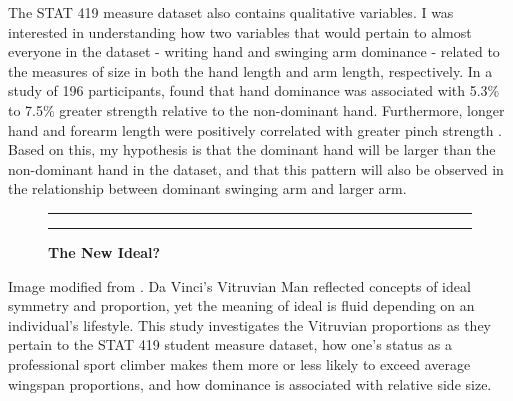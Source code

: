 \documentclass[]{article}
\begin{document}
\indent The STAT 419 measure dataset also contains qualitative
variables. I was interested in understanding how two variables that
would pertain to almost everyone in the dataset - writing hand and
swinging arm dominance - related to the measures of size in both the
hand length and arm length, respectively. In a study of 196
participants, \citet{Maleki:2019} found that hand dominance was
associated with 5.3\% to 7.5\% greater strength relative to the
non-dominant hand. Furthermore, longer hand and forearm length were
positively correlated with greater pinch strength \citep{Maleki:2019}.
Based on this, my hypothesis is that the dominant hand will be larger
than the non-dominant hand in the dataset, and that this pattern will
also be observed in the relationship between dominant swinging arm and
larger arm.

\begin{figure}[!ht]
    \hrule
    \caption{ \textbf{The New Ideal?} }
    \begin{center}
    \end{center}
    \label{fig:handout-1}
    \hrule
\end{figure}

Image modified from \citet{Thomas:2020}. Da Vinci's Vitruvian Man
reflected concepts of ideal symmetry and proportion, yet the meaning of
ideal is fluid depending on an individual's lifestyle. This study
investigates the Vitruvian proportions as they pertain to the STAT 419
student measure dataset, how one's status as a professional sport
climber makes them more or less likely to exceed average wingspan
proportions, and how dominance is associated with relative side size.
\end{document}
